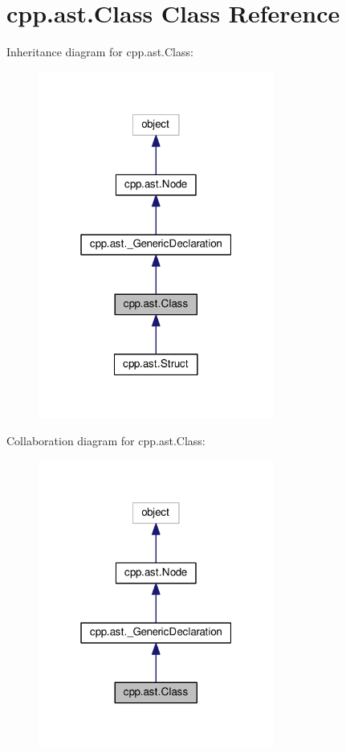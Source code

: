 \hypertarget{classcpp_1_1ast_1_1Class}{}\section{cpp.\+ast.\+Class Class Reference}
\label{classcpp_1_1ast_1_1Class}


Inheritance diagram for cpp.\+ast.\+Class\+:
\nopagebreak
\begin{figure}[H]
\begin{center}
\leavevmode
\includegraphics[width=220pt]{classcpp_1_1ast_1_1Class__inherit__graph}
\end{center}
\end{figure}


Collaboration diagram for cpp.\+ast.\+Class\+:
\nopagebreak
\begin{figure}[H]
\begin{center}
\leavevmode
\includegraphics[width=220pt]{classcpp_1_1ast_1_1Class__coll__graph}
\end{center}
\end{figure}
